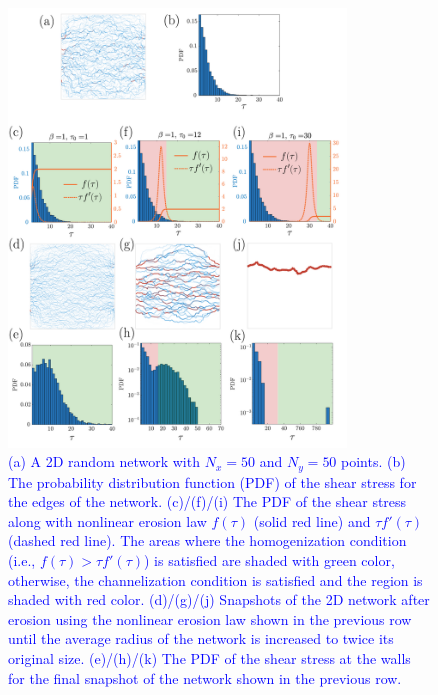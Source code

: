 \documentclass{article}
\begin{document}
   \begin{figure}[htp]
     \centering \includegraphics[width = 0.8\textwidth]{../sigmoidDelaunay.pdf}
     \caption{\textcolor{blue}{(a) A 2D random network with $N_x=50$ and $N_y=50$ points. (b) The probability distribution function (PDF) of the shear stress for the edges of the network. (c)/(f)/(i) The PDF of the shear stress along with nonlinear erosion law $f(\tau)$ (solid red line) and $\tau f'(\tau)$ (dashed red line). The areas where the homogenization condition (i.e., $f(\tau)>\tau f'(\tau)$) is satisfied are shaded with green color, otherwise, the channelization condition is satisfied and the region is shaded with red color. (d)/(g)/(j) Snapshots of the 2D network after erosion using the nonlinear erosion law shown in the previous row until the average radius of the network is increased to twice its original size. (e)/(h)/(k) The PDF of the shear stress at the walls for the final snapshot of the network shown in the previous row. 
    }}
     \label{SIfig:fig9-sigmoidDelaunay-r2}
 \end{figure}
 \\
 \clearpage 

%
\\
\vspace{4mm}
\end{document}
